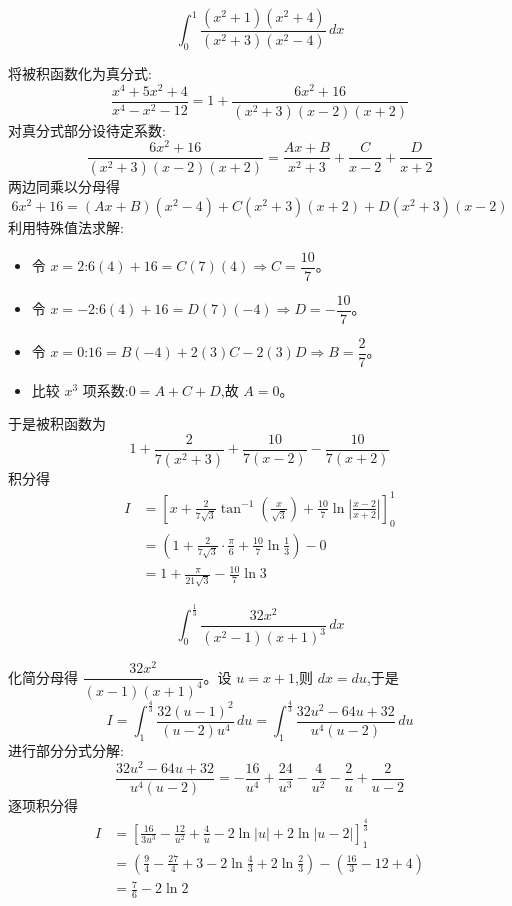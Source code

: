 \begin{questions}
    \question 
    \[
    \int_{0}^{1} \frac{(x^2+1)(x^2+4)}{(x^2+3)(x^2-4)} \, dx
    \]
    \begin{solution}
        将被积函数化为真分式:
        \[
        \frac{x^4+5x^2+4}{x^4-x^2-12} = 1 + \frac{6x^2+16}{(x^2+3)(x-2)(x+2)}
        \]
        对真分式部分设待定系数:
        \[
        \frac{6x^2+16}{(x^2+3)(x-2)(x+2)} = \frac{Ax+B}{x^2+3} + \frac{C}{x-2} + \frac{D}{x+2}
        \]
        两边同乘以分母得
        \[
        6x^2+16 = (Ax+B)(x^2-4) + C(x^2+3)(x+2) + D(x^2+3)(x-2)
        \]
        利用特殊值法求解:
        \begin{itemize}
        \item 令 $x = 2$:$6(4)+16 = C(7)(4) \Rightarrow C = \dfrac{10}{7}$。
        \item 令 $x = -2$:$6(4)+16 = D(7)(-4) \Rightarrow D = -\dfrac{10}{7}$。
        \item 令 $x = 0$:$16 = B(-4) + 2(3)C - 2(3)D\Rightarrow B = \dfrac{2}{7}$。
        \item 比较 $x^3$ 项系数:$0 = A + C + D$,故 $A = 0$。
        \end{itemize}
        于是被积函数为
        \[
        1 + \frac{2}{7(x^2+3)} + \frac{10}{7(x-2)} - \frac{10}{7(x+2)}
        \]
        积分得
        \begin{align*}
        I &= \left[ x + \frac{2}{7\sqrt{3}}\tan^{-1}\left(\frac{x}{\sqrt{3}}\right) + \frac{10}{7}\ln\left| \frac{x-2}{x+2} \right| \right]_{0}^{1} \\
        &= \left( 1 + \frac{2}{7\sqrt{3}} \cdot \frac{\pi}{6} + \frac{10}{7}\ln\frac{1}{3} \right) - 0 \\
        &= 1 + \frac{\pi}{21\sqrt{3}} - \frac{10}{7}\ln 3
        \end{align*}
    \end{solution}

    \question
    \[
    \int_{0}^{\frac{1}{3}} \frac{32x^2}{(x^2-1)(x+1)^3} \, dx
    \]
    \begin{solution}
        化简分母得 $\dfrac{32x^2}{(x-1)(x+1)^4}$。设 $u = x+1$,则 $dx = du$,于是
        \[
        I = \int_{1}^{\frac{4}{3}} \frac{32(u-1)^2}{(u-2)u^4} \, du = \int_{1}^{\frac{4}{3}} \frac{32u^2-64u+32}{u^4(u-2)} \, du
        \]
        进行部分分式分解:
        \[
        \frac{32u^2-64u+32}{u^4(u-2)} = -\frac{16}{u^4} + \frac{24}{u^3} - \frac{4}{u^2} - \frac{2}{u} + \frac{2}{u-2}
        \]
        逐项积分得
        \begin{align*}
        I &= \left[ \frac{16}{3u^3} - \frac{12}{u^2} + \frac{4}{u} - 2\ln|u| + 2\ln|u-2| \right]_{1}^{\frac{4}{3}} \\
        &= \left( \frac{9}{4} - \frac{27}{4} + 3 - 2\ln\frac{4}{3} + 2\ln\frac{2}{3} \right) - \left( \frac{16}{3} - 12 + 4 \right) \\
        &= \frac{7}{6} - 2\ln 2
        \end{align*}
    \end{solution}


\end{questions}
